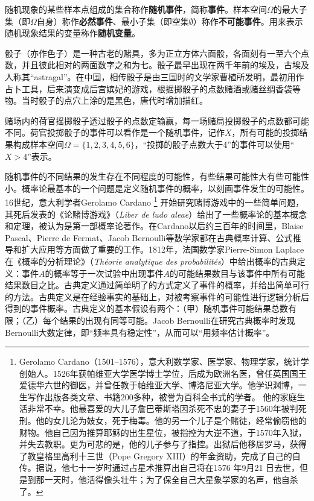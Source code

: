 随机现象的某些样本点组成的集合称作\textbf{随机事件}，简称\textbf{事件}。样本空间$\Omega$的最大子集（即$\Omega$自身）称作\textbf{必然事件}、最小子集（即空集$\emptyset$）称作\textbf{不可能事件}。用来表示随机现象结果的变量称作\textbf{随机变量}。

\begin{example}
骰子（亦作色子）是一种古老的赌具，多为正立方体六面骰，各面刻有一至六个点数，并且彼此相对的两面数字之和为七。骰子最早出现在两千年前的埃及，古埃及人称其“astragal”。在中国，相传骰子是由三国时的文学家曹植所发明，最初用作占卜工具，后来演变成后宫嫔妃的游戏，根据掷骰子的点数赌酒或赌丝绸香袋等物。当时骰子的点穴上涂的是黑色，唐代时增加描红。

赌场内的荷官摇掷骰子透过骰子的点数定输赢，每一场赌局投掷骰子的点数都可能不同。荷官投掷骰子的事件可以看作是一个随机事件，记作$X$，所有可能的投掷结果构成样本空间$\Omega=\{1,2,3,4,5,6\}$，“投掷的骰子点数大于4”的事件可以使用“$X>4$”表示。
\end{example}

随机事件的不同结果的发生存在不同程度的可能性，有些结果可能性大有些可能性小。概率论最基本的一个问题是定义随机事件的概率，以刻画事件发生的可能性。16世纪，意大利学者Gerolamo Cardano
\footnote{Gerolamo Cardano（1501--1576），意大利数学家、医学家、物理学家，统计学创始人。1526年获帕维亚大学医学博士学位，后成为欧洲名医，曾任英国国王爱德华六世的御医，并曾任教于帕维亚大学、博洛尼亚大学。他学识渊博，一生写作出版各类文章、书籍200多种，被誉为百科全书式的学者。
他的家庭生活非常不幸。他最喜爱的大儿子詹巴蒂斯塔因杀死不忠的妻子于1560年被判死刑。他的女儿沦为妓女，死于梅毒。他的另一个儿子是个赌徒，经常偷窃他的财物。他自己因为推算耶稣的出生星位，被指控为大逆不道，于1570年入狱，并失去教职。更为可悲的是，他的儿子参与了指控。出狱后他移居罗马，获得了教皇格里高利十三世（Pope Gregory XIII）的年金资助，完成了自己的自传。据说，他七十一岁时通过占星术推算出自己将在1576 年9月21 日去世，但是到那一天时，他活得像头壮牛；为了保全自己大星象学家的名声，他自杀了。}
开始研究赌博游戏中的一些简单问题，其死后发表的《论赌博游戏》（\textit{Liber de ludo aleae}）给出了一些概率论的基本概念和定理，被认为是第一部概率论著作。在Cardano以后约三百年的时间里，Blaise Pascal、Pierre de Fermat、Jacob Bernoulli等数学家都在古典概率计算、公式推导和扩大应用等方面做了重要的工作。1812年，法国数学家Pierre-Simon Laplace在《概率的分析理论》（\textit{Th\'{e}orie analytique des probabilit\'{e}s}）中给出概率的古典定义：事件$A$的概率等于一次试验中出现事件$A$的可能结果数目与该事件中所有可能结果数目之比。古典定义通过简单明了的方式定义了事件的概率，并给出简单可行的方法。古典定义是在经验事实的基础上，对被考察事件的可能性进行逻辑分析后得到的事件概率。古典定义的基本假设有两个：（甲）随机事件可能结果总数有限；（乙）每个结果的出现有同等可能。Jacob Bernoulli在研究古典概率时发现Bernoulli大数定律，即“频率具有稳定性”，从而可以“用频率估计概率”。

